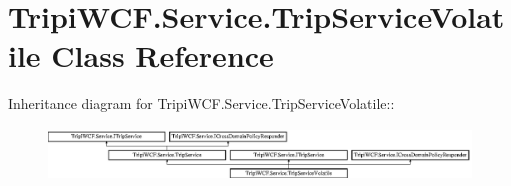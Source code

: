 \hypertarget{class_tripi_w_c_f_1_1_service_1_1_trip_service_volatile}{
\section{TripiWCF.Service.TripServiceVolatile Class Reference}
\label{class_tripi_w_c_f_1_1_service_1_1_trip_service_volatile}
}
Inheritance diagram for TripiWCF.Service.TripServiceVolatile::\begin{figure}[H]
\begin{center}
\leavevmode
\includegraphics[height=1.40468cm]{class_tripi_w_c_f_1_1_service_1_1_trip_service_volatile}
\end{center}
\end{figure}
